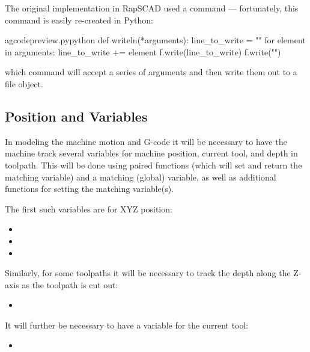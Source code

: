 \documentclass{ltxdoc}
\begin{document}
The original implementation in \textsf{RapSCAD} used a command 
 --- fortunately, 
this command is easily re-created in Python:

\lstset{firstnumber=\thegcpy}
\begin{writecode}{a}{gcodepreview.py}{python}
def writeln(*arguments):
    line_to_write = ""
    for element in arguments:
        line_to_write += element
    f.write(line_to_write)
    f.write("\n")
    
\end{writecode}
\addtocounter{gcpy}{7}

\noindent which command will accept a series of arguments and then write them out to a file 
object.

\subsection{Position and Variables}
 
In modeling the machine motion and G-code it will be necessary to have the machine track 
several variables for machine position, current tool, and depth in toolpath. 
This will be done using paired functions (which will set and return the  
matching variable) and a matching (global) variable, as well as additional functions for 
setting the matching variable(s).

\begin{samepage}
The first such variables are for XYZ position:

\begin{itemize}
 \item {}
 \item {}
 \item {}
\end{itemize}
\end{samepage}

\begin{samepage}
\noindent Similarly, for some toolpaths it will be necessary to track the depth along the Z-axis
as the toolpath is cut out:
 
\begin{itemize}
 \item {}
\end{itemize}
\end{samepage}

\begin{samepage}
\noindent It will further be necessary to have a variable for the current tool:

\begin{itemize}
 \item {}
\end{itemize}
\end{samepage}
\end{document}
